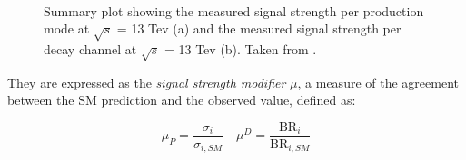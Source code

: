 \begin{figure}
    \myfloatalign
     \quad
     \\
    \caption[Signal strength modifiers]{Summary plot showing the measured signal strength per
    production mode at $\sqrt{s}$ = 13 Tev (a) and the measured signal
    strength per decay channel at $\sqrt{s}$ = 13 Tev (b). Taken from \cite{Sirunyan_2019}.}\label{fig:sigsm}
\end{figure}

They are expressed as the \emph{signal strength modifier} $\mu$, a measure of the agreement between the SM prediction and the observed value, defined as:

\[
\mu_P = \frac{\sigma_i}{\sigma_{i, SM}} \quad \mu^D = \frac{\text{BR}_i}{\text{BR}_{i, SM}}
\]

